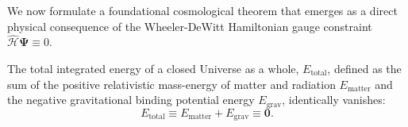 We now formulate a foundational cosmological theorem that emerges as a direct physical consequence of the Wheeler-DeWitt Hamiltonian gauge constraint $\hat{\mathcal{H}} \mathbf{\Psi} \equiv 0$.

\begin{theorem}\label{thm:zero_energy}
The total integrated energy of a closed Universe as a whole, $E_{\text{total}}$, defined as the sum of the positive relativistic mass-energy of matter and radiation $E_{\text{matter}}$ and the negative gravitational binding potential energy $E_{\text{grav}}$, identically vanishes:
\begin{equation}\label{eq:3.7}\tag{3.7}
E_{\text{total}} \equiv E_{\text{matter}} + E_{\text{grav}} \equiv \mathbf{0}.
\end{equation}
\end{theorem}


